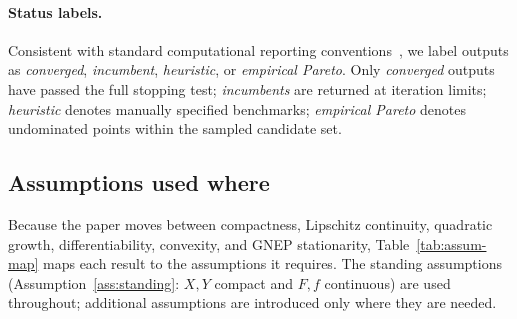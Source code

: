 \documentclass[11pt]{article}
\theoremstyle{definition}
\begin{document}
\paragraph{Status labels.} Consistent with standard computational reporting
conventions~\cite{dolan2002benchmarking,gould2015cutest}, we label
outputs as \emph{converged}, \emph{incumbent}, \emph{heuristic},
or \emph{empirical Pareto}. Only \emph{converged} outputs have
passed the full stopping test; \emph{incumbents} are returned at
iteration limits; \emph{heuristic} denotes manually specified
benchmarks; \emph{empirical Pareto} denotes undominated points
within the sampled candidate set.

\subsection{Assumptions used where}
\label{sec:assum-map}
Because the paper moves between compactness, Lipschitz continuity,
quadratic growth, differentiability, convexity, and GNEP
stationarity, Table~\ref{tab:assum-map} maps each result to the
assumptions it requires. The standing assumptions
(Assumption~\ref{ass:standing}: $X,Y$ compact and $F,f$
continuous) are used throughout; additional assumptions are
introduced only where they are needed.
\end{document}
